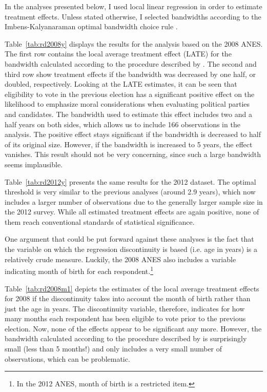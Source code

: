 \documentclass[12pt]{article}
\begin{document}
In the analyses presented below, I used local linear regression in order to estimate treatment effects. Unless stated otherwise, I selected bandwidths according to the Imbens-Kalyanaraman optimal bandwidth choice rule \citep{imbens2011optimal}.



Table~\ref{tab:rd2008y} displays the results for the analysis based on the 2008 ANES. The first row contains the local average treatment effect (LATE) for the bandwidth calculated according to the procedure described by \citet{imbens2011optimal}. The second and third row show treatment effects if the bandwidth was decreased by one half, or doubled, respectively. Looking at the LATE estimates, it can be seen that eligibility to vote in the previous election has a significant positive effect on the likelihood to emphasize moral considerations when evaluating political parties and candidates. The bandwidth used to estimate this effect includes two and a half years on both sides, which allows us to include 166 observations in the analysis. The positive effect stays significant if the bandwidth is decreased to half of its original size. However, if the bandwidth is increased to 5 years, the effect vanishes. This result should not be very concerning, since such a large bandwidth seems implausible.



Table~\ref{tab:rd2012y} presents the same results for the 2012 dataset. The optimal threshold is very similar to the previous analyses (around 2.9 years), which now includes a larger number of observations due to the generally larger sample size in the 2012 survey. While all estimated treatment effects are again positive, none of them reach conventional standards of statistical significance.

One argument that could be put forward against these analyses is the fact that the variable on which the regression discontinuity is based (i.e. age in years) is a relatively crude measure. Luckily, the 2008 ANES also includes a variable indicating month of birth for each respondent.\footnote{In the 2012 ANES, month of birth is a restricted item.}



Table~\ref{tab:rd2008m1} depicts the estimates of the local average treatment effects for 2008 if the discontinuity takes into account the month of birth rather than just the age in years. The discontinuity variable, therefore, indicates for how many months each respondent has been eligible to vote prior to the previous election. Now, none of the effects appear to be significant any more. However, the bandwidth calculated according to the procedure described by \citet{imbens2011optimal} is surprisingly small (less than 5 months!) and only includes a very small number of observations, which can be problematic.
\end{document}
